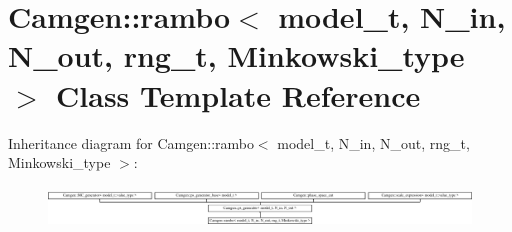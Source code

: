 \hypertarget{a00458}{\section{Camgen\-:\-:rambo$<$ model\-\_\-t, N\-\_\-in, N\-\_\-out, rng\-\_\-t, Minkowski\-\_\-type $>$ Class Template Reference}
\label{a00458}
}
Inheritance diagram for Camgen\-:\-:rambo$<$ model\-\_\-t, N\-\_\-in, N\-\_\-out, rng\-\_\-t, Minkowski\-\_\-type $>$\-:\begin{figure}[H]
\begin{center}
\leavevmode
\includegraphics[height=1.085271cm]{a00458}
\end{center}
\end{figure}
